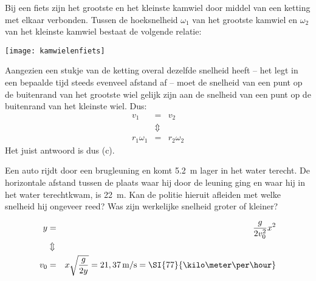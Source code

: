 \documentclass{ximera}
\begin{document}
\begin{exercise}
	Bij een fiets zijn het grootste en het kleinste kamwiel door middel van een ketting met elkaar verbonden. Tussen de hoeksnelheid $\omega_1$ van het grootste kamwiel en $\omega_2$ van het kleinste kamwiel bestaat de volgende relatie:
	\newline

\begin{minipage}[t]{0.4\textwidth}
	\begin{multipleChoice}
	\end{multipleChoice}
\end{minipage}
\hfill
\begin{minipage}{0.5\textwidth}
		\begin{image}
			\texttt{[image: kamwielenfiets]}
		\end{image}
	\end{minipage}
\begin{oplossing}
	Aangezien een stukje van de ketting overal dezelfde snelheid heeft -- het legt in een bepaalde tijd steeds evenveel afstand af -- moet de snelheid van een punt op de buitenrand van het grootste wiel gelijk zijn aan de snelheid van een punt op de buitenrand van het kleinste wiel. Dus:
	\begin{eqnarray*}
		v_1&=&v_2\\
		&\Updownarrow&\\
		r_1\omega_1&=&r_2\omega_2
	\end{eqnarray*}
	Het juist antwoord is dus (c).
\end{oplossing}
\end{exercise}

\begin{exercise}
	Een auto rijdt door een brugleuning en komt \SI{5,2}{\meter} lager in het water terecht. De horizontale afstand tussen de plaats waar hij door de leuning ging en waar hij in het water terechtkwam, is \SI{22}{\meter}. Kan de politie hieruit afleiden met welke snelheid hij ongeveer reed? Was zijn werkelijke snelheid groter of kleiner?
	\begin{oplossing}
	\begin{eqnarray*}
		y&=&\frac{g}{2v_0^2}x^2\\
		&\Updownarrow&\\
		v_0&=&x\sqrt{\frac{g}{2y}}=21,37\rm\,m/s=\SI{77}{\kilo\meter\per\hour}
	\end{eqnarray*}
	\end{oplossing}
\end{exercise}
\end{document}
